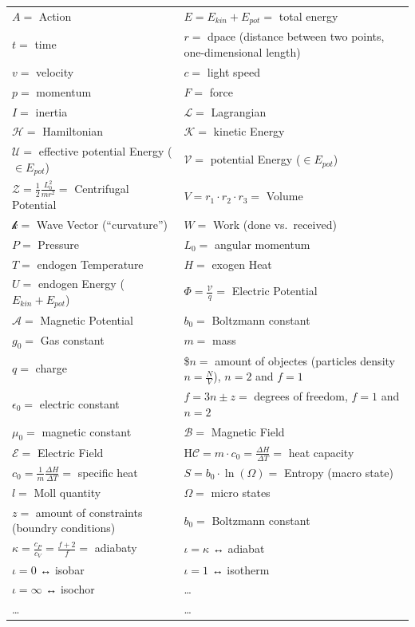 \documentclass[
  letterpaper,
  DIV=11,
  numbers=noendperiod]{scrartcl}
\begin{document}
\begin{longtable}[]{@{}
  >{\raggedright\arraybackslash}p{}
  >{\raggedright\arraybackslash}p{}@{}}
\toprule\noalign{}
\endhead
\bottomrule\noalign{}
\endlastfoot
\(A =\) Action & \(E = E_{kin} + E_{pot} =\) total energy \\
\(t =\) time & \(r =\) dpace (distance between two points,
one-dimensional length) \\
\(v =\) velocity & \(c =\) light speed \\
\(p =\) momentum & \(F =\) force \\
\(I =\) inertia & \(\mathcal{L} =\) Lagrangian \\
\(\mathcal{H} =\) Hamiltonian & \(\mathcal{K} =\) kinetic Energy \\
\(\mathcal{U} =\) effective potential Energy (\(\in E_{pot}\)) &
\(\mathcal{V} =\) potential Energy (\(\in E_{pot}\)) \\
\(\mathcal{Z} = \frac{1}{2}\frac{L_0^2}{mr^2} =\) Centrifugal Potential
& \(V = r_1 \cdot r_2 \cdot r_3 =\) Volume \\
\(\mathcal{k} =\) Wave Vector (``curvature'') & \(W =\) Work (done
vs.~received) \\
\(P =\) Pressure & \(L_0 =\) angular momentum \\
\(T =\) endogen Temperature & \(H =\) exogen Heat \\
\(U =\) endogen Energy (\(E_{kin} + E_{pot}\)) &
\(\Phi = \frac{\mathcal{V}}{q} =\) Electric Potential \\
\(\mathcal{A} =\) Magnetic Potential & \(b_0 =\) Boltzmann constant \\
\(g_0 =\) Gas constant & \(m =\) mass \\
\(q =\) charge & \$\(n =\) amount of objectes (particles density
\(n=\frac{N}{V}\)), \(n=2\) and \(f=1\) \\
\({\epsilon}_0 =\) electric constant & \(f = 3n \pm z =\) degrees of
freedom, \(f=1\) and \(n=2\) \\
\({\mu}_0 =\) magnetic constant & \(\mathcal{B} =\) Magnetic Field \\
\(\mathcal{E} =\) Electric Field &
H\(\mathcal{C} = m \cdot c_0 = \frac{\Delta H}{\Delta T}  =\) heat
capacity \\
\(c_0 = \frac{1}{m}\frac{\Delta H}{\Delta T} =\) specific heat &
\(S = b_0 \cdot \ln(\Omega) =\) Entropy (macro state) \\
\(l =\) Moll quantity & \(\Omega =\) micro states \\
\(z =\) amount of constraints (boundry conditions) & \(b_0 =\) Boltzmann
constant \\
\(\kappa = \frac{c_P}{c_V} = \frac{f+2}{f} =\) adiabaty &
\(\iota = \kappa\) ↔ adiabat \\
\(\iota = 0\) ↔ isobar & \(\iota = 1\) ↔ isotherm \\
\(\iota = \infty\) ↔ isochor & \ldots{} \\
\ldots{} & \ldots{} \\
\end{longtable}
\end{document}

